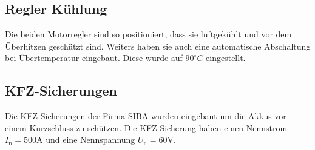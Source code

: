 \subsection{Regler Kühlung}
Die beiden Motorregler sind so positioniert, dass sie luftgekühlt und vor dem Überhitzen geschützt sind. Weiters haben sie auch eine automatische Abschaltung bei Übertemperatur
eingebaut. Diese wurde auf $90^\circ C$ eingestellt. 

\subsection{KFZ-Sicherungen}
Die KFZ-Sicherungen der Firma SIBA wurden eingebaut um die Akkus vor einem Kurzschluss zu schützen. Die KFZ-Sicherung haben einen Nennstrom $I_\mathrm{n} = 500\mathrm{A}$
und eine Nennspannung $U_\mathrm{n} = 60 \mathrm{V}$.